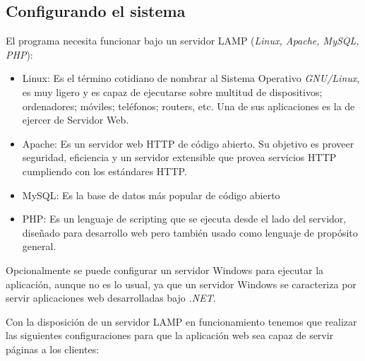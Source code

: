 \subsection{Configurando el sistema}

El programa necesita funcionar bajo un servidor LAMP (\emph{Linux, Apache, MySQL, PHP}):

    \begin{itemize}
        \item Linux: Es el término cotidiano de nombrar al Sistema Operativo \emph{GNU/Linux}, es muy ligero y es capaz de ejecutarse sobre multitud de dispositivos; ordenadores; móviles; teléfonos; routers, etc. Una de sus aplicaciones es la de ejercer de Servidor Web.
        \item Apache: Es un servidor web HTTP de código abierto. Su objetivo es proveer seguridad, eficiencia y un servidor extensible que provea servicios HTTP cumpliendo con los estándares HTTP.
        \item MySQL: Es la base de datos más popular de código abierto
        \item PHP: Es un lenguaje de scripting que se ejecuta desde el lado del servidor, diseñado para desarrollo web pero también usado como lenguaje de propósito general.
    \end{itemize}

Opcionalmente se puede configurar un servidor Windows para ejecutar la aplicación, aunque no es lo usual, ya que un servidor Windows se caracteriza por servir aplicaciones web desarrolladas bajo \emph{.NET}.

Con la disposición de un servidor LAMP en funcionamiento tenemos que realizar las siguientes configuraciones para que la aplicación web sea capaz de servir páginas a los clientes:

